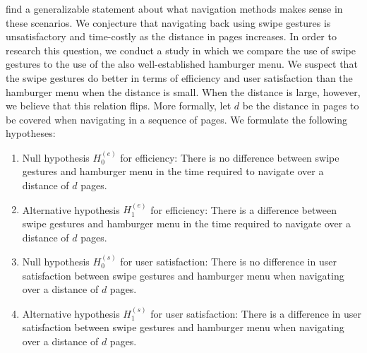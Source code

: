 \documentclass{sig-alternate-05-2015}
\begin{document}
find a generalizable statement about what navigation methods makes sense in these scenarios.
We conjecture that
navigating back using swipe gestures is unsatisfactory and time-costly as the
distance in pages increases. In order to research this question, we conduct a
study in which we compare the use of swipe gestures to the use of the also
well-established hamburger menu. We suspect that the swipe gestures do better
in terms of efficiency and user satisfaction than the hamburger menu when the
distance is small. When the distance is large, however, we believe that this
relation flips. More formally, let $d$ be the distance in pages to be covered
when navigating in a sequence of pages.  We formulate the following
hypotheses:
\begin{enumerate}
  \item Null hypothesis $H_0^{(e)}$ for efficiency:
    There is no difference between swipe gestures and hamburger menu in the
    time required to navigate over a distance of $d$ pages.
  \item Alternative hypothesis $H_1^{(e)}$ for efficiency: There is a
    difference between swipe gestures and hamburger menu in the time required
    to navigate over a distance of $d$ pages.
  \item Null hypothesis $H_0^{(s)}$ for user satisfaction: There is no
    difference in user satisfaction between swipe gestures and hamburger menu
    when navigating over a distance of $d$ pages.
  \item Alternative hypothesis $H_1^{(s)}$ for user satisfaction: There is a
    difference in user satisfaction between swipe gestures and hamburger menu
    when navigating over a distance of $d$ pages.
\end{enumerate}
\end{document}
